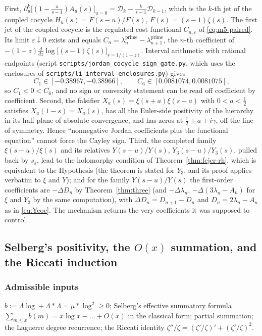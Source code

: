 \documentclass[11pt]{amsart}
\theoremstyle{definition}
\theoremstyle{remark}
\theoremstyle{definition}
\newcommand{\half}{\tfrac{1}{2}}
\newcommand{\gam}{\gamma}
\newcommand{\eps}{\varepsilon}
\begin{document}
\noindent First, $\partial_u^k\bigl[(1-\tfrac{u}{s-1})A_u(s)\bigr]_{u=0}
=\mathcal D_k-\tfrac{k}{s-1}\mathcal D_{k-1}$, which is the $k$-th jet of the coupled cocycle
$H_u(s)=F(s-u)/F(s)$, $F(s)=(s-1)\zeta(s)$. The first jet of the coupled cocycle is the regulated
cost functional $C_{n,\eps}$ of \eqref{eq:m5-paired}. Its limit $\eps\downarrow0$ exists and equals
$C_n=\lambda_n^{\mathrm{prime}}-\lambda_{n+1}^{\mathrm{prime}}$, the $n$-th coefficient of
$-(1-z)\frac{d}{dz}\log\bigl[(s-1)\zeta(s)\bigr]_{s=1/(1-z)}$. Interval arithmetic with rational
endpoints (script \texttt{scripts/jordan\_cocycle\_sign\_gate.py}, which uses the enclosures of
\texttt{scripts/li\_interval\_enclosures.py}) gives
\begin{equation}\label{eq:jordan-witness}
   C_1\in[-0.38967,-0.38966],\qquad C_6\in[0.0081074,0.0081075],
\end{equation}
so $C_1<0<C_6$, and no sign or convexity statement can be read off coefficient by coefficient. Second, the
falsifier $X_a(s)=\xi(s+a)\xi(s-a)$ with $0<a<\half$ satisfies $X_a(1-s)=X_a(s)$, has all the
Euler-side positivity of the hierarchy in its half-plane of absolute convergence, and has zeros
at $\half\pm a+i\gam$, off the line of symmetry. Hence ``nonnegative Jordan coefficients plus the
functional equation'' cannot force the Cayley sign. Third, the completed
family $\xi(s-u)/\xi(s)$ and its relatives $Y(s-u)/Y(s)$, $Y_3(s-u)/Y_3(s)$, pulled back by $s_\eps$,
lead to the holomorphy condition of Theorem~\ref{thm:fejer-rh}, which is equivalent to the
Hypothesis (the theorem is stated for $Y_3$, and its proof applies verbatim to $\xi$ and $Y$); and for the family $Y(s-u)/Y(s)$ the first-order coefficients are $-\Delta D_n$ by
Theorem~\ref{thm:three} (and $-\Delta\lambda_n$, $-\Delta(3\lambda_n-A_n)$ for $\xi$ and $Y_3$ by the same computation), with $\Delta D_n=D_{n+1}-D_n$ and $D_n=2\lambda_n-A_n$ as in
\eqref{eq:Ycoc}. The mechanism returns the very coefficients it was supposed to control.

\subsection{Selberg's positivity, the $O(x)$ summation, and the Riccati induction}
\label{sec:selberg}

\subsubsection*{Admissible inputs}
$b:=\Lambda\log+\Lambda*\Lambda=\mu*\log^2\ge0$; Selberg's effective summatory formula
$\sum_{m\le x}b(m)=x\log x-\ldots+O(x)$ in the classical form; partial summation; the Laguerre
degree recurrence; the Riccati identity $\zeta''/\zeta=(\zeta'/\zeta)'+(\zeta'/\zeta)^2$.
\end{document}
